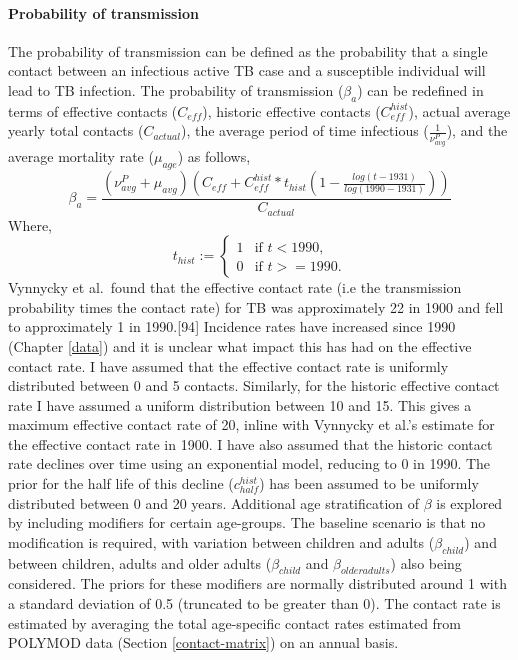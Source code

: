 \documentclass[11pt,twoside]{bristolthesis}
\begin{document}
  \hypertarget{probability-of-transmission}{%
  \paragraph{Probability of transmission}\label{probability-of-transmission}}
  
  The probability of transmission can be defined as the probability that a single contact between an infectious active TB case and a susceptible individual will lead to TB infection. The probability of transmission (\(\beta_a\)) can be redefined in terms of effective contacts (\(C_{eff}\)), historic effective contacts (\(C^{hist}_{eff}\)), actual average yearly total contacts (\(C_{actual}\)), the average period of time infectious (\(\frac{1}{\nu_{avg}^{P}}\)), and the average mortality rate (\(\mu_{age}\)) as follows,
  \begin{equation}
  \beta_a = \frac{(\nu_{avg}^{P} + \mu_{avg})\left(C_{eff} + C^{hist}_{eff} * t_{hist}\left(1 - \frac{log(t-1931)}{log(1990-1931)}\right)\right)}{C_{actual}}
  \label{eq:beta-eq}
  \end{equation}
  Where,
  \begin{equation}
  t_{hist}  := \begin{cases}
  1 & \text{if } t < 1990, \\
  0 & \text{if } t >= 1990. \end{cases}
  \end{equation}
  Vynnycky et al.~found that the effective contact rate (i.e the transmission probability times the contact rate) for TB was approximately 22 in 1900 and fell to approximately 1 in 1990.{[}94{]} Incidence rates have increased since 1990 (Chapter \ref{data}) and it is unclear what impact this has had on the effective contact rate. I have assumed that the effective contact rate is uniformly distributed between 0 and 5 contacts. Similarly, for the historic effective contact rate I have assumed a uniform distribution between 10 and 15. This gives a maximum effective contact rate of 20, inline with Vynnycky et al.'s estimate for the effective contact rate in 1900. I have also assumed that the historic contact rate declines over time using an exponential model, reducing to 0 in 1990. The prior for the half life of this decline (\(c^{hist}_{half}\)) has been assumed to be uniformly distributed between 0 and 20 years. Additional age stratification of \(\beta\) is explored by including modifiers for certain age-groups. The baseline scenario is that no modification is required, with variation between children and adults (\(\beta_{child}\)) and between children, adults and older adults (\(\beta_{child}\) and \(\beta_{older adults}\)) also being considered. The priors for these modifiers are normally distributed around 1 with a standard deviation of 0.5 (truncated to be greater than 0). The contact rate is estimated by averaging the total age-specific contact rates estimated from POLYMOD data (Section \ref{contact-matrix}) on an annual basis.
  
\end{document}
